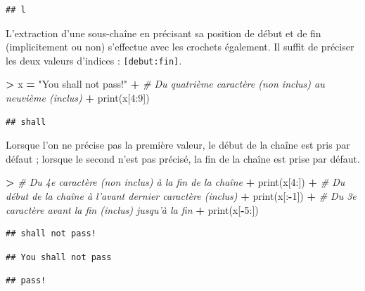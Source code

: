 \documentclass[12pt,]{book}
\newenvironment{Shaded}{\begin{snugshade}}{\end{snugshade}}
\newcommand{\DecValTok}[1]{\textcolor[rgb]{0.00,0.00,0.81}{#1}}
\newcommand{\StringTok}[1]{\textcolor[rgb]{0.31,0.60,0.02}{#1}}
\newcommand{\CommentTok}[1]{\textcolor[rgb]{0.56,0.35,0.01}{\textit{#1}}}
\newcommand{\OperatorTok}[1]{\textcolor[rgb]{0.81,0.36,0.00}{\textbf{#1}}}
\newcommand{\BuiltInTok}[1]{#1}
\newcommand{\NormalTok}[1]{#1}
\numberwithin{equation}{section}
\numberwithin{countremarque}{section}
\begin{document}
\begin{lstlisting}
## l
\end{lstlisting}

L'extraction d'une sous-chaîne en précisant sa position de début et de
fin (implicitement ou non) s'effectue avec les crochets également. Il
suffit de préciser les deux valeurs d'indices :
\texttt{{[}debut:fin{]}}.

\begin{Shaded}
\begin{Highlighting}[]
\OperatorTok{>}\NormalTok{ x }\OperatorTok{=} \StringTok{"You shall not pass!"}
\OperatorTok{+} \CommentTok{# Du quatrième caractère (non inclus) au neuvième (inclus)}
\OperatorTok{+} \BuiltInTok{print}\NormalTok{(x[}\DecValTok{4}\NormalTok{:}\DecValTok{9}\NormalTok{])}
\end{Highlighting}
\end{Shaded}

\begin{lstlisting}
## shall
\end{lstlisting}

Lorsque l'on ne précise pas la première valeur, le début de la chaîne
est pris par défaut ; lorsque le second n'est pas précisé, la fin de la
chaîne est prise par défaut.

\begin{Shaded}
\begin{Highlighting}[]
\OperatorTok{>} \CommentTok{# Du 4e caractère (non inclus) à la fin de la chaîne}
\OperatorTok{+} \BuiltInTok{print}\NormalTok{(x[}\DecValTok{4}\NormalTok{:])}
\OperatorTok{+} \CommentTok{# Du début de la chaîne à l'avant dernier caractère (inclus)}
\OperatorTok{+} \BuiltInTok{print}\NormalTok{(x[:}\OperatorTok{-}\DecValTok{1}\NormalTok{])}
\OperatorTok{+} \CommentTok{# Du 3e caractère avant la fin (inclus) jusqu'à la fin}
\OperatorTok{+} \BuiltInTok{print}\NormalTok{(x[}\OperatorTok{-}\DecValTok{5}\NormalTok{:])}
\end{Highlighting}
\end{Shaded}

\begin{lstlisting}
## shall not pass!
\end{lstlisting}

\begin{lstlisting}
## You shall not pass
\end{lstlisting}

\begin{lstlisting}
## pass!
\end{lstlisting}
\end{document}
